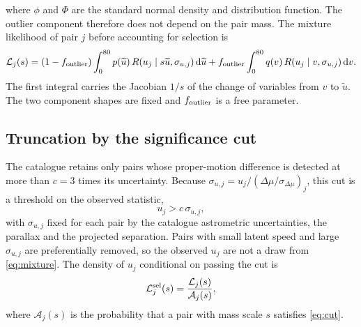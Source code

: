 where $\phi$ and $\Phi$ are the standard normal density and distribution function. The outlier component therefore does not depend on the pair mass. The mixture likelihood of pair $j$ before accounting for selection is
\begin{equation}
 \mathcal L_j(s)=(1-f_{\rm outlier})\int_0^{80}p(\widetilde u)\,
 R(u_j\mid s\widetilde u,\sigma_{u,j})\,\mathrm{d}\widetilde u
 +f_{\rm outlier}\int_0^{80}q(v)\,R(u_j\mid v,\sigma_{u,j})\,\mathrm{d} v .
 \label{eq:mixture}
\end{equation}
The first integral carries the Jacobian $1/s$ of the change of variables from $v$ to $\widetilde u$. The two component shapes are fixed and $f_{\rm outlier}$ is a free parameter.

\subsection{Truncation by the significance cut}

The catalogue retains only pairs whose proper-motion difference is detected at more than $c=3$ times its uncertainty. Because $\sigma_{u,j}=u_j/(\Delta\mu/\sigma_{\Delta\mu})_j$, this cut is a threshold on the observed statistic,
\begin{equation}
 u_j>c\,\sigma_{u,j},
 \label{eq:cut}
\end{equation}
with $\sigma_{u,j}$ fixed for each pair by the catalogue astrometric uncertainties, the parallax and the projected separation. Pairs with small latent speed and large $\sigma_{u,j}$ are preferentially removed, so the observed $u_j$ are not a draw from \cref{eq:mixture}. The density of $u_j$ conditional on passing the cut is
\begin{equation}
 \mathcal L^{\rm sel}_j(s)=\frac{\mathcal L_j(s)}{\mathcal A_j(s)},
 \label{eq:truncated}
\end{equation}
where $\mathcal A_j(s)$ is the probability that a pair with mass scale $s$ satisfies \cref{eq:cut}.

